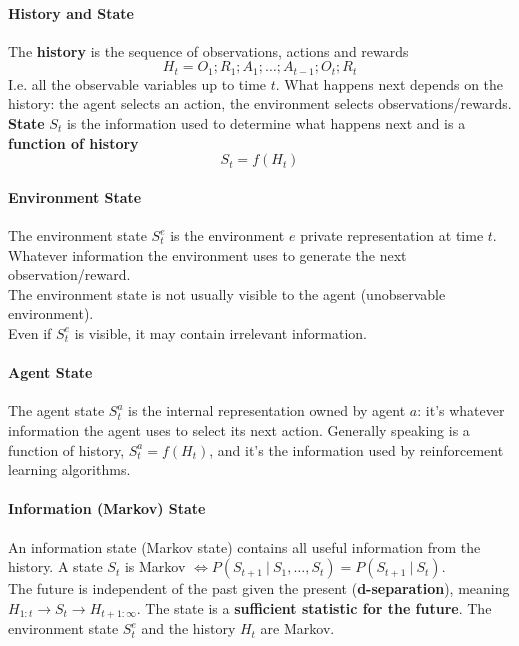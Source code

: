 \documentclass[10pt]{report}
\begin{document}
\paragraph{History and State} The \textbf{history} is the sequence of observations, actions and rewards
$$H_t = O_1;R_1;A_1;\ldots;A_{t-1};O_t;R_t$$
I.e. all the observable variables up to time $t$. What happens next depends on the history: the agent selects an action, the environment selects observations/rewards.\\
\textbf{State} $S_t$ is the information used to determine what happens next and is a \textbf{function of history}
$$S_t = f(H_t)$$
\paragraph{Environment State} The environment state $S_t^e$ is the environment $e$ private representation at time $t$. Whatever information the environment uses to generate the next observation/reward.\\
The environment state is not usually visible to the agent (unobservable environment).\\
Even if $S_t^e$ is visible, it may contain irrelevant information.
\paragraph{Agent State} The agent state $S_t^a$ is the internal representation owned by agent $a$: it's whatever information the agent uses to select its next action. Generally speaking is a function of history, $S_t^a = f(H_t)$, and it's the information used by reinforcement learning algorithms.
\paragraph{Information (Markov) State} An information state (Markov state) contains all useful information from the history. A state $S_t$ is Markov $\Leftrightarrow P(S_{t+1}\:|\:S_1,\ldots,S_t) = P(S_{t+1}\:|\:S_t)$.\\
The future is independent of the past given the present (\textbf{d-separation}), meaning $H_{1:t}\rightarrow S_t \rightarrow H_{t+1:\infty}$. The state is a \textbf{sufficient statistic for the future}. The environment state $S_t^e$ and the history $H_t$ are Markov.
\end{document}
